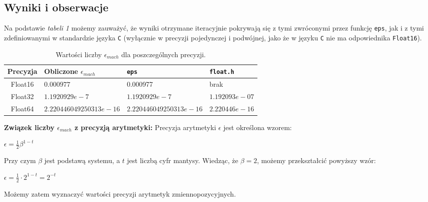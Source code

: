 \documentclass[12pt]{article}
\begin{document}
    \newpage

    \subsection*{Wyniki i obserwacje}
        Na podstawie \textit{tabeli 1} możemy zauważyć, że wyniki otrzymane iteracyjnie pokrywają się z tymi zwróconymi przez funkcję \texttt{eps},
        jak i z tymi zdefiniowanymi w standardzie języka \texttt{C}
        (wyłącznie w precyzji pojedynczej i podwójnej, jako że w języku \texttt{C} nie ma odpowiednika \texttt{Float16}).

        \begin{table}[h!]
            \centering
            \begin{tabularx}{0.9\textwidth}{c l l l}
                \hline
                Precyzja & Obliczone $\epsilon_{mach}$ & \texttt{eps} & \texttt{float.h} \\
                \hline
                Float16 & $0.000977$ & 0.000977 & brak \\
                Float32 & $1.1920929e-7$ & $1.1920929e-7$ & $1.192093e-07$ \\
                Float64 & $2.220446049250313e-16$ & $2.220446049250313e-16$ & $2.220446e-16$ \\
                \hline
            \end{tabularx}
            \caption{Wartości liczby $\epsilon_{mach}$ dla poszczególnych precyzji.}
            \label{table:macheps}
        \end{table}
        \noindent \newline\newline
        \textbf{Związek liczby $\epsilon_{mach}$ z precyzją arytmetyki:}
        \newline
        Precyzja arytmetyki $\epsilon$ jest określona wzorem:
        \begin{center}
        \begin{math}
            \epsilon = \frac{1}{2}\beta^{1 - t}
        \end{math}
        \end{center}
        Przy czym $\beta$ jest podstawą systemu, a $t$ jest liczbą cyfr mantysy. Wiedząc, że $\beta = 2$, możemy przekształcić powyższy wzór:
        \begin{center}
        \begin{math}
            \epsilon = \frac{1}{2} \cdot 2^{1 - t} = 2^{-t}
        \end{math}
        \end{center}
        Możemy zatem wyznaczyć wartości precyzji arytmetyk zmiennopozycyjnych.
\end{document}
